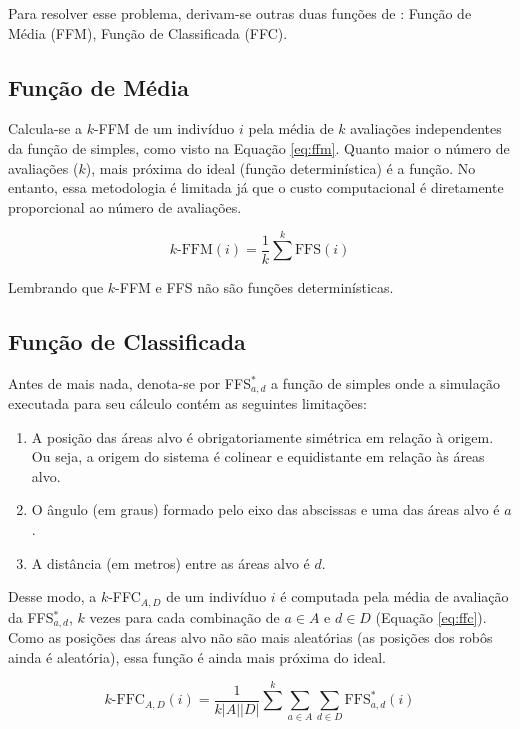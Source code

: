 Para resolver esse problema, derivam-se outras duas funções de \fitness: Função de \fitness Média (FFM), Função de \fitness Classificada (FFC).

\subsection{Função de \fitness Média}

Calcula-se a $k$-FFM de um indivíduo $i$ pela média de $k$ avaliações independentes da função de \fitness simples, como visto na Equação \ref{eq:ffm}. Quanto maior o número de avaliações ($k$), mais próxima do ideal (função determinística) é a função. No entanto, essa metodologia é limitada já que o custo computacional é diretamente proporcional ao número de avaliações.

\begin{equation}
\label{eq:ffm}
k\text{-FFM} (i) = \frac{1}{k} \sum^{k} \text{FFS} (i)
\end{equation}

Lembrando que $k$-FFM e FFS não são funções determinísticas.

\subsection{Função de \fitness Classificada}

Antes de mais nada, denota-se por FFS$_{a,d}^{*}$ a função de \fitness simples onde a simulação executada para seu cálculo contém as seguintes limitações:

\begin{enumerate}
    \item A posição das áreas alvo é obrigatoriamente simétrica em relação à origem. Ou seja, a origem do sistema é colinear e equidistante em relação às áreas alvo.
    \item O ângulo (em graus) formado pelo eixo das abscissas e uma das áreas alvo é $a$.
    \item A distância (em metros) entre as áreas alvo é $d$.
\end{enumerate}

Desse modo, a $k$-FFC$_{A,D}$ de um indivíduo $i$ é computada pela média de avaliação da FFS$_{a,d}^{*}$, $k$ vezes para cada combinação de $a \in A$ e $d \in D$ (Equação \ref{eq:ffc}). Como as posições das áreas alvo não são mais aleatórias (as posições dos robôs ainda é aleatória), essa função é ainda mais próxima do ideal.

\begin{equation}
\label{eq:ffc}
k\text{-FFC}_{A,D} (i) = \frac{1}{k |A| |D|} \sum^{k} \sum_{a \in A} \sum_{d \in D} \text{FFS}_{a,d}^{*} (i)
\end{equation}

